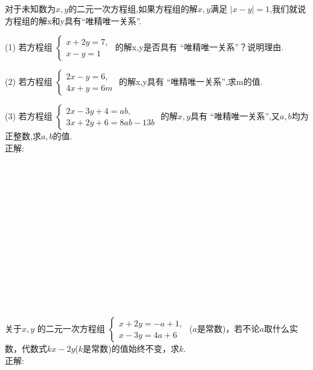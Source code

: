 \item {
    对于未知数为$x, y$的二元一次方程组,如果方程组的解$x,y$满足 $|x-y| = 1$,我们就说方程组的解x和y具有``唯精唯一关系''.

    (1) 若方程组
    $\begin{cases}
        x + 2y = 7, \\ 
        x - y = 1  
    \end{cases}$
    的解x,y是否具有 ``唯精唯一关系''？说明理由.

    (2) 若方程组
    $\begin{cases}
        2x - y = 6, \\ 
        4x + y = 6m  
    \end{cases}$
    的解x,y具有 ``唯精唯一关系'',求m的值.
    
    (3) 若方程组
    $\begin{cases}
        2x - 3y + 4 = ab, \\ 
        3x + 2y + 6 = 8ab - 13b  
    \end{cases}$
    的解$x,y$具有 ``唯精唯一关系'',又$a,b$均为正整数,求$a,b$的值.
    \ifshowSolution
        \fangsong{}
        \\
        正解:
    \else
        \\ \\ \\ \\ \\ \\ \\ \\ \\ \\ \\ \\ \\ \\
    \fi
}

\item {
    关于$x,y$ 的二元一次方程组
    $\begin{cases}
        x + 2y = -a+1, \\ 
        x - 3y = 4a + 6  
    \end{cases}$
    ($a$是常数)，若不论$a$取什么实数，代数式$kx - 2y$($k$是常数)的值始终不变，求$k$.
    \ifshowSolution
        \fangsong{}
        \\
        正解:
    \else
        \\ \\ \\ \\ \\
    \fi
}
